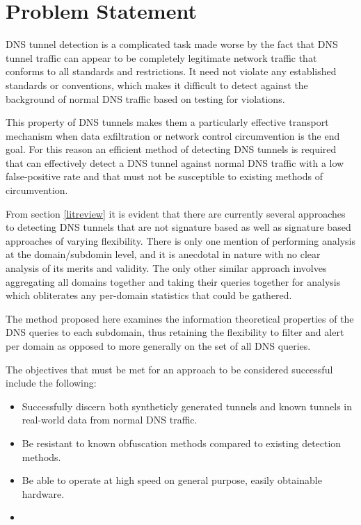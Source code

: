 \documentclass[12pt]{article}
\theoremstyle{remark}
\theoremstyle{definition}
\theoremstyle{definition}
\theoremstyle{definition}
\begin{document}
\section{Problem Statement}

DNS tunnel detection is a complicated task made worse by the fact that DNS
tunnel traffic can appear to be completely legitimate network traffic that conforms to all standards and restrictions. It
need not violate any established standards or conventions, which makes it
difficult to detect against the background of normal DNS traffic based on testing for violations.

This property of DNS tunnels makes them a particularly effective transport mechanism
when data exfiltration or network control circumvention is the end goal. For
this reason an efficient method of detecting DNS tunnels is required that can
effectively detect a DNS tunnel against normal DNS traffic with a low
false-positive rate and that must not be susceptible to existing methods of
circumvention.

From section \ref{litreview} it is evident that there are currently several approaches to detecting DNS tunnels that are not signature based as well as signature based approaches of varying flexibility. There is only one mention of performing analysis at the domain/subdomin level, and it is anecdotal in nature with no clear analysis of its merits and validity. The only other similar approach involves aggregating all domains together and taking their queries together for analysis which obliterates any per-domain statistics that could be gathered.

The method proposed here examines the information theoretical properties of the DNS queries to each subdomain, thus retaining the flexibility to filter and alert per domain as opposed to more generally on the set of all DNS queries.

The objectives that must be met for an approach to be considered successful include the following:

\begin{itemize}
\item Successfully discern both syntheticly generated tunnels and known tunnels in real-world data from normal DNS traffic.
\item Be resistant to known obfuscation methods compared to existing detection methods.
\item Be able to operate at high speed on general purpose, easily obtainable hardware.
\item 
\end{itemize}
\end{document}
